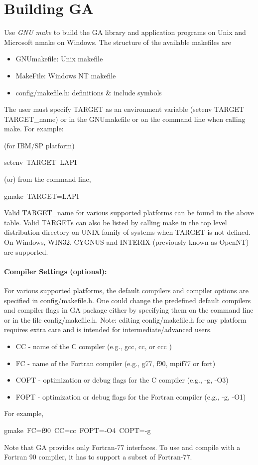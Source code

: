 \section{Building GA }

Use\emph{ GNU make} to build the GA library and application programs
on Unix and Microsoft nmake on Windows. The structure of the available
makefiles are
\begin{itemize}
\item GNUmakefile: Unix makefile 
\item MakeFile: Windows NT makefile 
\item config/makefile.h: definitions \& include symbols
\end{itemize}
The user must specify TARGET as an environment variable (setenv TARGET
TARGET\_name) or in the GNUmakefile or on the command line when calling
make. For example: 

(for IBM/SP platform)
\begin{lyxcode}
setenv~TARGET~LAPI~
\end{lyxcode}
(or) from the command line, 
\begin{lyxcode}
gmake~TARGET=LAPI
\end{lyxcode}
Valid TARGET\_name for various supported platforms can be found in
the above table. Valid TARGETs can also be listed by calling make
in the top level distribution directory on UNIX family of systems
when TARGET is not defined. On Windows, WIN32, CYGNUS and INTERIX
(previously known as OpenNT) are supported. 


\paragraph{Compiler Settings (optional): }

For various supported platforms, the default compilers and compiler
options are specified in config/makefile.h. One could change the predefined
default compilers and compiler flags in GA package either by specifying
them on the command line or in the file config/makefile.h. Note: editing
config/makefile.h for any platform requires extra care and is intended
for intermediate/advanced users.
\begin{itemize}
\item CC - name of the C compiler (e.g., gcc, cc, or ccc ) 
\item FC - name of the Fortran compiler (e.g., g77, f90, mpif77 or fort) 
\item COPT - optimization or debug flags for the C compiler (e.g., -g, -O3) 
\item FOPT - optimization or debug flags for the Fortran compiler (e.g.,
-g, -O1)
\end{itemize}
For example,
\begin{lyxcode}
gmake~FC=f90~CC=cc~FOPT=-O4~COPT=-g
\end{lyxcode}
Note that GA provides only Fortran-77 interfaces. To use and compile
with a Fortran 90 compiler, it has to support a subset of Fortran-77. 


